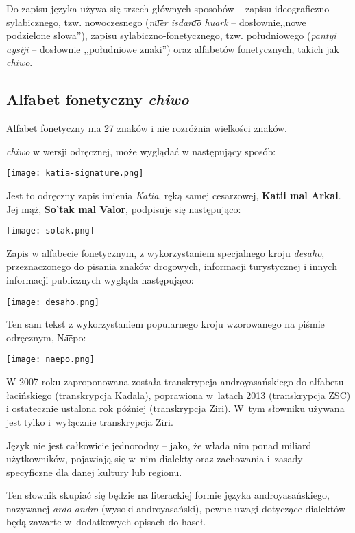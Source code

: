 \begin{spacing}{1.1}
Do zapisu języka używa się trzech głównych sposobów -- zapisu
ideograficzno-sylabicznego, tzw. nowoczesnego (\emph{nu͞er isdara͞o huark} --
dosłownie,,nowe podzielone słowa''), zapisu sylabiczno-fonetycznego, tzw.
południowego (\emph{pantyi aysiji} -- dosłownie ,,południowe znaki'') oraz
alfabetów fonetycznych, takich jak \emph{chiwo}.

\subsection{Alfabet fonetyczny \emph{chiwo}}

Alfabet fonetyczny ma 27 znaków i nie rozróżnia wielkości znaków.

\emph{chiwo} w wersji odręcznej, może wyglądać w następujący sposób:

\begin{center}
    \texttt{[image: katia-signature.png]}    
\end{center}

Jest to odręczny zapis imienia \emph{Katia}, ręką samej cesarzowej,
\textbf{Katii mal Arkai}. Jej mąż, \textbf{So'tak mal Valor}, podpisuje się 
następująco:

\begin{center}
    \texttt{[image: sotak.png]}
\end{center}

Zapis w alfabecie fonetycznym, z wykorzystaniem specjalnego kroju \emph{desaho},
przeznaczonego do pisania znaków drogowych, informacji turystycznej i innych
informacji publicznych wygląda następująco:

\begin{center}
    \texttt{[image: desaho.png]}
\end{center}

\skipline

Ten sam tekst z wykorzystaniem popularnego kroju wzorowanego na piśmie
odręcznym, Na͞epo:

\begin{center}
    \texttt{[image: naepo.png]}
\end{center}

W 2007 roku zaproponowana została transkrypcja androyasańskiego do alfabetu 
łacińskiego (transkrypcja Kadala), poprawiona w~latach 2013 (transkrypcja 
ZSC) i ostatecznie ustalona rok później (transkrypcja Ziri). W~tym słowniku
używana jest tylko i~wyłącznie transkrypcja Ziri.

Język nie jest całkowicie jednorodny -- jako, że włada nim ponad miliard 
użytkowników, pojawiają się w~nim dialekty oraz zachowania i~zasady specyficzne 
dla danej kultury lub regionu. 

Ten słownik skupiać się będzie na literackiej formie języka androyasańskiego,
nazywanej \emph{ardo andro} (wysoki androyasański), pewne uwagi dotyczące
dialektów będą zawarte w~dodatkowych opisach do haseł.

\end{spacing}